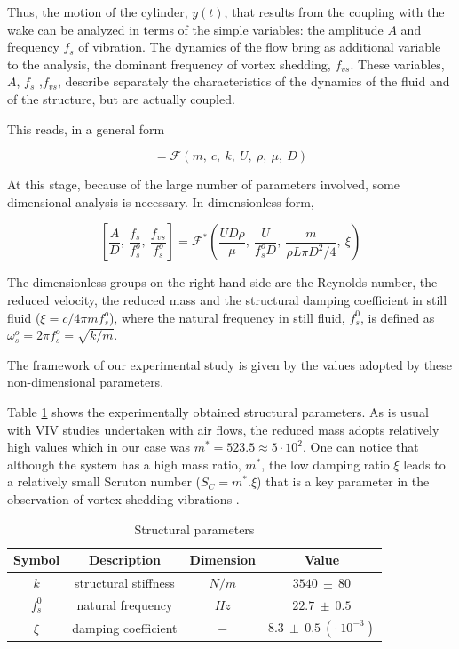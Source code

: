 \documentclass[review]{elsarticle}
\begin{document}
Thus, the motion of the cylinder, $y(t)$, that results from the coupling with the wake can be analyzed in terms of the simple variables: the amplitude $A$ and  frequency $f_s$ of vibration. The dynamics of the flow bring as additional variable to the analysis, the dominant frequency of vortex shedding, $f_{vs}$. These variables, $A$, $f_ s$ ,$ f_{vs}$, describe separately the characteristics of the dynamics of the fluid and of the structure, but are actually coupled. 

This reads, in a general form

\begin{equation}
[A, ~ f_s, ~ f_{vs}] = \mathcal{F} \left(m, ~ c, ~ k, ~ U, ~ \rho, ~ \mu, ~ D \right)
\end{equation}

At this stage, because of the large number of parameters involved, some dimensional analysis is necessary. In dimensionless form,

\begin{equation}
\left[ \frac{A}{D}, ~ \frac{f_s}{f_s^o}, ~ \frac{f_{vs}}{f_s^o} \right] =  \mathcal{F}^* \left(\frac{UD\rho}{\mu}, ~ \frac{U}{f_s^o D}, ~ \frac{m}{\rho L \pi D^2 / 4}, ~ \xi \right)
\end{equation}

The dimensionless groups on the right-hand side are the Reynolds number, the reduced velocity, the reduced mass and the structural damping coefficient in still fluid ($\xi=c/4\pi m f_s^o$), where the natural frequency in still fluid, $f_{s}^{0}$, is defined as $\omega_s^o = 2\pi f_s^o = \sqrt{k/m}$.

The framework of our experimental study is given by the values adopted by these non-dimensional parameters. 

Table \ref{tab:01} shows the experimentally obtained structural parameters. As is usual with VIV studies undertaken with air flows, the reduced mass adopts relatively high values which in our case was $m^{*} =  523.5 \approx 5 \cdot 10^2$. One can notice that although the system has a high mass ratio, $m^*$, the low damping ratio $\xi$ leads to a relatively small Scruton number ($S_C =m^*. \xi$)  that is a key parameter in the observation of vortex shedding vibrations \citep{Blevins1990}.

\begin{table}[h]
\centering
\begin{tabular}{|c|c|c|c|}
\hline
Symbol & Description & Dimension & Value \\
\hline	
$k$ & structural stiffness & $N/m$ & $3540 ~\pm ~80$ \\
\hline
$f_{s}^{0}$ & natural frequency & $Hz$ & $ 22.7 ~\pm ~0.5$ \\
\hline	
$\xi$ & damping coefficient & $-$ & $ 8.3 ~ \pm ~ 0.5 ~ (\cdot ~10^{-3})$\\
\hline
\end{tabular}
\caption{Structural parameters}
\label{tab:01}
\end{table}
\end{document}
